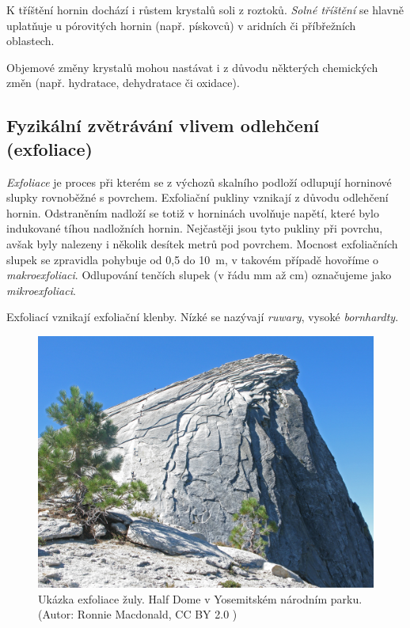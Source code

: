 K tříštění hornin dochází i růstem krystalů soli z roztoků. \emph{Solné tříštění} se hlavně uplatňuje u pórovitých hornin (např. pískovců) v aridních či příbřežních oblastech.

Objemové změny krystalů mohou nastávat i z důvodu některých chemických změn (např. hydratace, dehydratace či oxidace).

\subsection{Fyzikální zvětrávání vlivem odlehčení (exfoliace)}
\emph{Exfoliace} je proces při kterém se z výchozů skalního podloží odlupují horninové slupky rovnoběžné s povrchem. Exfoliační pukliny vznikají z důvodu odlehčení hornin. Odstraněním nadloží se totiž v horninách uvolňuje napětí, které bylo indukované tíhou nadložních hornin. Nejčastěji jsou tyto pukliny při povrchu, avšak byly nalezeny i několik desítek metrů pod povrchem.
Mocnost exfoliačních slupek se zpravidla pohybuje od 0,5 do \SI{10}{\metre}, v takovém případě hovoříme o \emph{makroexfoliaci}. Odlupování tenčích slupek (v řádu \si{mm} až \si{cm}) označujeme jako \emph{mikroexfoliaci}.

Exfoliací vznikají exfoliační klenby. Nízké se nazývají \emph{ruwary}, vysoké \emph{bornhardty}.

\begin{figure}[h]
	\centering
	\includegraphics[width=1\linewidth]{obrazky/zvetravani/exfoliace}
	\caption{Ukázka exfoliace žuly. Half Dome v Yosemitském národním parku. (Autor: Ronnie Macdonald, CC BY 2.0 )}
	\label{fig:exfoliace}
\end{figure}


